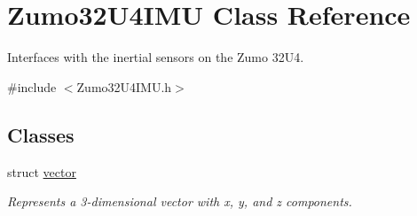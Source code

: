 \hypertarget{class_zumo32_u4_i_m_u}{}\section{Zumo32\+U4\+I\+MU Class Reference}
\label{class_zumo32_u4_i_m_u}


Interfaces with the inertial sensors on the Zumo 32\+U4.  




{\ttfamily \#include $<$Zumo32\+U4\+I\+M\+U.\+h$>$}

\subsection*{Classes}
\begin{DoxyCompactItemize}
\item 
struct \hyperlink{struct_zumo32_u4_i_m_u_1_1vector}{vector}
\begin{DoxyCompactList}\small\item\em Represents a 3-\/dimensional vector with x, y, and z components. \end{DoxyCompactList}\end{DoxyCompactItemize}
